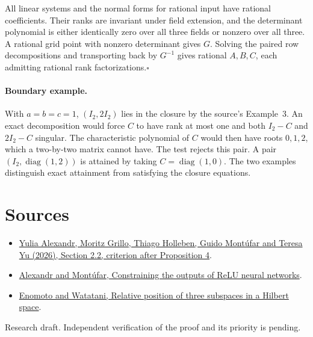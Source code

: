 \documentclass[11pt]{article}
\begin{document}
All linear systems and the normal forms for rational input have rational coefficients. Their ranks are invariant under field extension, and the determinant polynomial is either identically zero over all three fields or nonzero over all three. A rational grid point with nonzero determinant gives $G$. Solving the paired row decompositions and transporting back by $G^{-1}$ gives rational $A,B,C$, each admitting rational rank factorizations.\hfill$\square$

\paragraph{Boundary example.} With $a=b=c=1$, $(I_2,2I_2)$ lies in the closure by the source's Example~3. An exact decomposition would force $C$ to have rank at most one and both $I_2-C$ and $2I_2-C$ singular. The characteristic polynomial of $C$ would then have roots $0,1,2$, which a two-by-two matrix cannot have. The test rejects this pair. A pair $(I_2,\operatorname{diag}(1,2))$ is attained by taking $C=\operatorname{diag}(1,0)$. The two examples distinguish exact attainment from satisfying the closure equations.

\section*{Sources}
\begin{itemize}
\item \href{https://arxiv.org/abs/2611.23846}{Yulia Alexandr, Moritz Grillo, Thiago Holleben, Guido Mont\'ufar and Teresa Yu (2026), Section 2.2, criterion after Proposition 4}.
\item \href{https://arxiv.org/abs/2508.03867}{Alexandr and Mont\'ufar, Constraining the outputs of ReLU neural networks}.
\item \href{https://arxiv.org/abs/1407.6852}{Enomoto and Watatani, Relative position of three subspaces in a Hilbert space}.
\end{itemize}
{\small Research draft. Independent verification of the proof and its priority is pending.}
\end{document}

